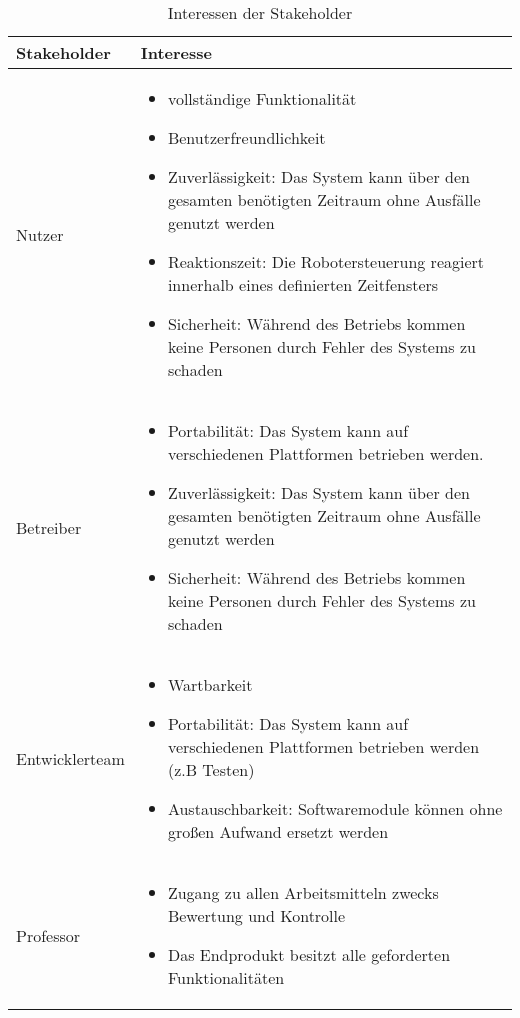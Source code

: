 \begin{table}[h!]
	\caption{Interessen der Stakeholder}
	\label{tab:stakeholder}
	\centering
	\begin{tabular}{|p{2.5cm}|p{10cm}|}
		\hline
		\textbf{Stakeholder} & \textbf{Interesse}  \\
		\hline
		Nutzer   
		& \parbox{10cm}{\begin{itemize}
			\item vollständige Funktionalität
			\item Benutzerfreundlichkeit
			\item Zuverlässigkeit: Das System kann über den gesamten benötigten Zeitraum ohne Ausfälle genutzt werden
			\item Reaktionszeit: Die Robotersteuerung reagiert innerhalb eines definierten Zeitfensters
			\item Sicherheit: Während des Betriebs kommen keine Personen durch Fehler des Systems zu schaden
		\end{itemize}}
		\\
		\hline
		Betreiber 
		&\parbox{10cm}{\begin{itemize}
			\item Portabilität: Das System kann auf verschiedenen Plattformen betrieben werden.
			\item Zuverlässigkeit: Das System kann über den gesamten benötigten Zeitraum ohne Ausfälle genutzt werden
			\item Sicherheit: Während des Betriebs kommen keine Personen durch Fehler des Systems zu schaden
		\end{itemize}}
		\\
		\hline
		Entwicklerteam 
		&\parbox{10cm}{ \begin{itemize}
			\item Wartbarkeit
			\item Portabilität: Das System kann auf verschiedenen Plattformen betrieben werden (z.B Testen)
			\item Austauschbarkeit: Softwaremodule können ohne großen Aufwand ersetzt werden
		\end{itemize}}
		\\
		\hline
		Professor & \parbox{10cm}{\begin{itemize}
			\item Zugang zu allen Arbeitsmitteln zwecks Bewertung und Kontrolle
			\item Das Endprodukt besitzt alle geforderten Funktionalitäten
		\end{itemize}}
		\\
		\hline
	\end{tabular}
\end{table}



